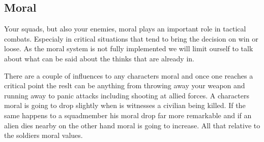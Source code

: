 \subsection{Moral}
Your squads, but also your enemies, moral plays an important role in tactical combats. Especialy in critical situations that tend to bring the decision on win or loose. As the moral system is not fully implemented we will limit ourself to talk about what can be said about the thinks that are already in. 

There are a couple of influences to any characters moral and once one reaches a critical point the reslt can be anything from throwing away your weapon and running away to panic attacks including shooting at allied forces.
A characters moral is going to drop slightly when is witnesses a civilian being killed. If the same happens to a squadmember his moral drop far more remarkable and if an alien dies nearby on the other hand moral is going to increase. All that relative to the soldiers moral values.
